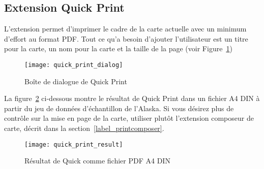 \subsection{Extension Quick Print}


L'extension  permet d'imprimer le cadre de
la carte actuelle avec un minimum d'effort au format PDF. Tout ce qu'a besoin
d'ajouter l'utilisateur est un titre pour la carte, un nom pour la carte et la
taille de la page (voir Figure~\ref{fig:quickprint})
 
\begin{figure}[ht]
   \begin{center}
   \caption{Bo\^ite de dialogue de Quick Print
\nixcaption}\label{fig:quickprint}\smallskip
   \texttt{[image: quick\_print\_dialog]}
\end{center}
\end{figure}

La figure~\ref{fig:quickprint_result} ci-dessous montre le r\'esultat de Quick
Print dans un fichier A4 DIN \`a partir du jeu de donn\'ees d'\'echantillon de
l'Alaska. Si vous d\'esirez plus de contr\^ole sur la mise en page de la carte,
utiliser plut\^ot l'extension composeur de carte, d\'ecrit dans la
section~\ref{label_printcomposer}.

\begin{figure}[ht]
   \begin{center}
   \caption{R\'esultat de Quick comme fichier PDF A4 DIN
\nixcaption}\label{fig:quickprint_result}\smallskip
   \texttt{[image: quick\_print\_result]}
\end{center}
\end{figure}


